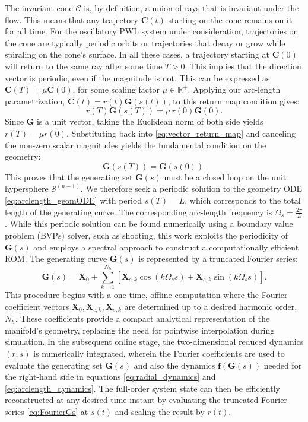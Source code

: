 \documentclass[a4paper,9pt,parskip=half,english]{article}
\theoremstyle{plain}
\theoremstyle{definition}
\newcommand{\mR}{\mathbb{R}}
\newcommand{\vf}{\mathbf f}
\newcommand{\vC}{\mathbf C}
\newcommand{\vG}{\mathbf G}
\newcommand{\vX}{\mathbf X}
\begin{document}
The invariant cone $\mathcal{C}$ is, by definition, a union of rays that is invariant under the flow. This means that any trajectory $\vC(t)$ starting on the cone remains on it for all time. For the oscillatory PWL system under consideration, trajectories on the cone are typically periodic orbits or trajectories that decay or grow while spiraling on the cone's surface. In all these cases, a trajectory starting at $\vC(0)$ will return to the same ray after some time $T>0$. This implies that the direction vector is periodic, even if the magnitude is not. This can be expressed as $\vC(T) = \mu \vC(0)$, for some scaling factor $\mu \in \mR^+$. Applying our arc-length parametrization, $\vC(t) = r(t) \vG(s(t))$, to this return map condition gives: 
\begin{equation}\label{eq:vector_return_map}
	r(T) \vG(s(T)) = \mu \, r(0) \vG(0).
\end{equation}
Since $\vG$ is a unit vector, taking the Euclidean norm of both side yields $r(T) = \mu r(0)$. Substituting back into \eqref{eq:vector_return_map} and canceling the non-zero scalar magnitudes yields the fundamental condition on the geometry:
\begin{equation}
	\vG(s(T)) = \vG(s(0)).
\end{equation}
This proves that the generating set $\vG(s)$ must be a closed loop on the unit hypersphere $\mathcal{S}^{(n-1)}$. We therefore seek a periodic solution to the geometry ODE \eqref{eq:arclength_geomODE} with period $s(T)=L$, which corresponds to the total length of the generating curve. The corresponding arc-length frequency is $\Omega_s = \frac{2\pi}{L}$. While this periodic solution can be found numerically using a boundary value problem (BVPs) solver, such as shooting, this work exploits the periodicity of $\vG(s)$ and employs a spectral approach  to construct a computationally efficient ROM. The generating curve $\vG(s)$ is represented by a truncated Fourier series: 
\begin{equation}\label{eq:FourierGs}
	\vG(s) = \vX_{0} + \sum_{k=1}^{N_h} \left[ \vX_{c,k} \cos(k \Omega_s s) + \vX_{s,k} \sin(k \Omega_s s) \right].
\end{equation}
This procedure begins with a one-time, offline computation where the Fourier coefficient vectors $\vX_{0}, \vX_{c,k}, \vX_{s,k}$  are determined up to a desired harmonic order, $N_h$. These coefficients provide a compact analytical representation of the manifold's geometry, replacing the need for pointwise interpolation during simulation. In the subsequent online stage, the two-dimensional reduced dynamics $(\dot{r}, \dot{s})$ is numerically integrated, wherein the Fourier coefficients are used to evaluate the generating set $\vG(s)$ and also the dynamics $\vf(\vG(s))$ needed for the right-hand side in equations \eqref{eq:radial_dynamics} and \eqref{eq:arclength_dynamics}. The full-order system state can then be efficiently reconstructed at any desired time instant by evaluating the truncated Fourier series \eqref{eq:FourierGs} at $s(t)$ and scaling the result by $r(t)$. 
\end{document}
